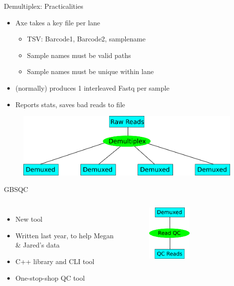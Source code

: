 \documentclass[t]{beamer}
\begin{document}
\begin{frame}{Demultiplex: Practicalities}
  \begin{itemize}
    \item Axe takes a key file per lane
      \begin{itemize}
        \item TSV: Barcode1, Barcode2, samplename
        \item Sample names must be valid paths
        \item Sample names must be unique within lane
      \end{itemize}
    \item (normally) produces 1 interleaved Fastq per sample
    \item Reports stats, saves bad reads to file
  \end{itemize}
  \begin{figure}[h]
    \centering
    \includegraphics[width=\textwidth]{img/pl-demux.png}
  \end{figure}
\end{frame}

\begin{frame}{GBSQC}
  \begin{columns}[t]
    \begin{itemize}
      \item New tool
      \item Written last year, to help Megan \& Jared's data
      \item C++ library and CLI tool
      \item One-stop-shop QC tool
    \end{itemize}
    \begin{figure}[h]
      \centering
      \includegraphics[width=0.5\textwidth]{img/pl-qc-one.png}
    \end{figure}
  \end{columns}
\end{frame}
\end{document}
